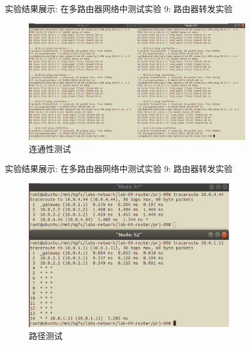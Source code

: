 \documentclass{beamer}
\begin{document}
\begin{frame}{实验结果展示: 在多路由器网络中测试}{实验 9: 路由器转发实验}
    \begin{figure}[h]
        \centering %
        \includegraphics[width=270pt]{../lab-09-router/readme.assets/trace-connectivity.png}
        \caption{连通性测试} %
    \end{figure}
\end{frame}
\begin{frame}{实验结果展示: 在多路由器网络中测试}{实验 9: 路由器转发实验}
    \begin{figure}[h]
        \centering %
        \includegraphics[width=250pt]{../lab-09-router/readme.assets/trace-route-res.png}
        \caption{路径测试} %
    \end{figure}
\end{frame}
\end{document}
